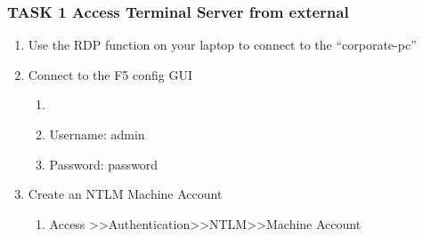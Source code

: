 \documentclass[letterpaper,10pt,english]{sphinxmanual}
\begin{document}
\subsubsection{TASK 1 \textendash{} Access Terminal Server from external}
\label{\detokenize{class2/module3/lab1:task-1-access-terminal-server-from-external}}

\begin{enumerate}
\item {} 
Use the RDP function on your laptop to connect to the “corporate-pc”

\item {} 
Connect to the F5 config GUI
\begin{enumerate}
\item {} 

\item {} 
Username: admin

\item {} 
Password: password

\end{enumerate}

\item {} 
Create an NTLM Machine Account
\begin{enumerate}
\item {} 
Access \textgreater{}\textgreater{}Authentication\textgreater{}\textgreater{}NTLM\textgreater{}\textgreater{}Machine Account

\end{enumerate}

\end{enumerate}
\end{document}
